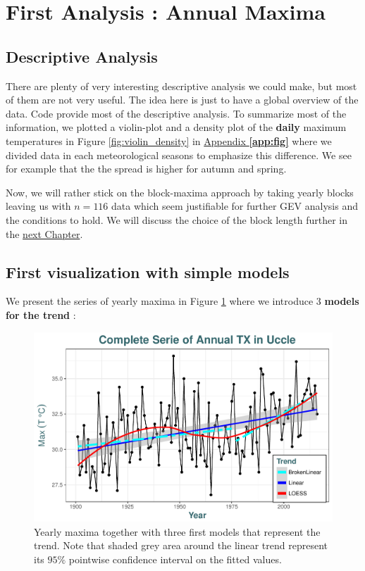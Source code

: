 \section{First Analysis : Annual Maxima}\label{sec:firstana}


\subsection{Descriptive Analysis}

There are plenty of very interesting descriptive analysis we could make, but most of them are not very useful. The idea here is just to have a global overview of the data. Code provide most of the descriptive analysis. To summarize most of the information, we plotted a violin-plot and a density plot of the \textbf{daily} maximum temperatures in Figure \ref{fig:violin_density} in \hyperref[app:fig]{Appendix \textbf{\ref{app:fig}}} where we divided data in each meteorological seasons to emphasize this difference. We see for example that the the spread is higher for autumn and spring.

Now, we will rather stick on the block-maxima approach by taking yearly blocks leaving us with $n=116$ data which seem justifiable for further GEV analysis and the conditions to hold. We will discuss the choice of the block length further in the \hyperref[sec:anagev]{next Chapter}.

\subsection{First visualization with simple models}\label{sec:firstvisu}

We present the series of yearly maxima in Figure \ref{first_fig} where we introduce 3 \textbf{models for the trend} :


\begin{figure}[!htb]
	\centering\includegraphics[width=.8\linewidth]{gg12.pdf}\caption{Yearly maxima together with three first models that represent the trend. Note that shaded grey area around the linear trend represent its $95\%$ pointwise confidence interval on the fitted values. }%
\label{first_fig}
\end{figure}


